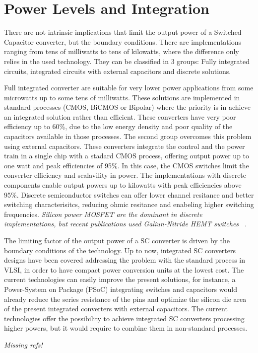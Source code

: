 \section*{Power Levels and Integration}

There are not intrinsic implications that limit the output power of a Switched Capacitor converter, but the boundary conditions. There are implementations ranging from tens of milliwatts to tens of kilowatts, where the difference only relies in the used technology. They can be classified in 3 groups: Fully integrated circuits, integrated circuits with external capacitors and discrete solutions.

Full integrated converter are suitable for very lower power applications from some microwatts up to some tens of milliwatts. These solutions are implemented in standard processes (CMOS, BiCMOS or Bipolar) where the priority is in achieve an integrated solution rather than efficient. These converters have very poor efficiency up to 60\%, due to the low energy density and poor quality of the capacitors available in those processes. The second group overcomes this problem using external capacitors. These converters integrate the control and the power train in a single chip with a stadard CMOS process, offering  output power up to one watt and peak efficiencies of 95\%. In this case, the CMOS switches limit the converter efficiency and scalavility in power.
The implementations with discrete components enable output powers up to kilowatts with peak efficiencies above 95\%. Discrete semiconductor switches can offer lower channel resitance and better switching characterisitcs, reducing ohmic resitance and enabeling higher switching frequencies.  \emph{ \color{red} Silicon power MOSFET are the dominant in discrete implementations, but recent publications used Galiun-Nitride HEMT switches ~\cite{11Scott,12Scott}}.

The limiting factor of the output power of a SC converter is driven by the boundary conditions of the technology. Up to now, integrated SC converters designs have been covered addressing the problem with the standard process in VLSI, in order to have compact power conversion units at the lowest cost. The current technologies can easily improve the present solutions, for instance, a Power-System on Package (PSoC) integrating switches and capacitors would already reduce the series resistance of the pins and optimize the silicon die area of the present integrated converters with external capacitors. The current technologies offer the possibility to achieve integrated SC converters processing higher powers, but it would require to combine them in non-standard processes.

\emph{\color{red} Missing refs!}


%
% 